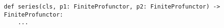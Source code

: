 \begin{verbatim}
def series(cls, p1: FiniteProfunctor, p2: FiniteProfunctor) -> FiniteProfunctor:
    ...
\end{verbatim}